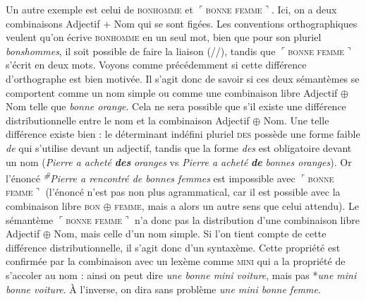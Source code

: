 \begin{sloppypar}
Un autre exemple est celui de \textsc{bonhomme} et $⌜$\textsc{bonne} \textsc{femme}$⌝$. Ici, on a deux combinaisons Adjectif + Nom qui se sont figées. Les conventions orthographiques veulent qu’on écrive \textsc{bonhomme} en un seul mot, bien que pour son pluriel \textit{bonshommes}, il soit possible de faire la liaison (//), tandis que $⌜$\textsc{bonne} \textsc{femme}$⌝$ s’écrit en deux mots. Voyons comme précédemment si cette différence d’orthographe est bien motivée. Il s’agit donc de savoir si ces deux sémantèmes se comportent comme un nom simple ou comme une combinaison libre Adjectif ${\oplus}$ Nom telle que \textit{bonne orange}. Cela ne sera possible que s’il existe une différence distributionnelle entre le nom et la combinaison Adjectif ${\oplus}$ Nom. Une telle différence existe bien : le déterminant indéfini pluriel \textsc{des} possède une forme faible \textit{de} qui s’utilise devant un adjectif, tandis que la forme \textit{des} est obligatoire devant un nom (\textit{Pierre a acheté} \textbf{\textit{des}} \textit{oranges} vs \textit{Pierre a acheté} \textbf{\textit{de}} \textit{bonnes oranges}). Or l’énoncé \textit{\textsuperscript{\#}}\textit{Pierre a rencontré de bonnes femmes} est impossible avec $⌜$\textsc{bonne} \textsc{femme}$⌝$ (l’énoncé n’est pas non plus agrammatical, car il est possible avec la combinaison libre \textsc{bon} ${\oplus}$ \textsc{femme}, mais a alors un autre sens que celui attendu). Le sémantème $⌜$\textsc{bonne} \textsc{femme}$⌝$ n’a donc pas la distribution d’une combinaison libre Adjectif ${\oplus}$ Nom, mais celle d’un nom simple. Si l’on tient compte de cette différence distributionnelle, il s’agit donc d’un syntaxème. Cette propriété est confirmée par la combinaison avec un lexème comme \textsc{mini} qui a la propriété de s’accoler au nom : ainsi on peut dire \textit{une bonne mini voiture}, mais pas *\textit{une mini bonne voiture}. À l’inverse, on dira sans problème \textit{une mini bonne femme}.
\end{sloppypar}\largerpage

